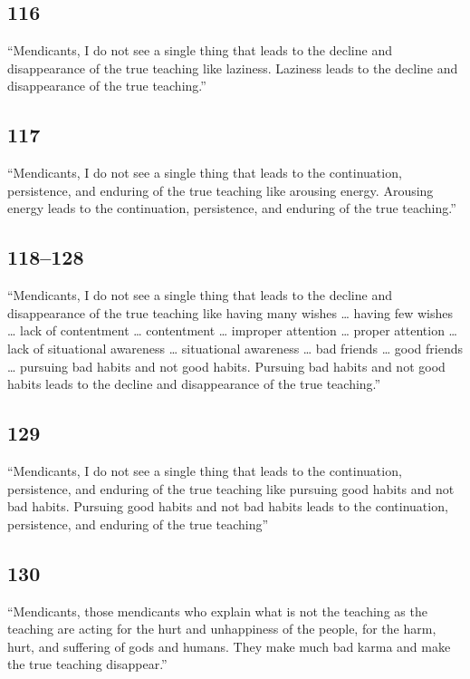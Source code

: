 \documentclass[12pt,openany]{book}%
\begin{document}
\subsection*{116 }

“Mendicants, I do not see a single thing that leads to the decline and disappearance of the true teaching like laziness. Laziness leads to the decline and disappearance of the true teaching.” 

\subsection*{117 }

“Mendicants, I do not see a single thing that leads to the continuation, persistence, and enduring of the true teaching like arousing energy. Arousing energy leads to the continuation, persistence, and enduring of the true teaching.” 

\subsection*{118–128 }

“Mendicants, I do not see a single thing that leads to the decline and disappearance of the true teaching like having many wishes … having few wishes … lack of contentment … contentment … improper attention … proper attention … lack of situational awareness … situational awareness … bad friends … good friends … pursuing bad habits and not good habits. Pursuing bad habits and not good habits leads to the decline and disappearance of the true teaching.” 

\subsection*{129 }

“Mendicants, I do not see a single thing that leads to the continuation, persistence, and enduring of the true teaching like pursuing good habits and not bad habits. Pursuing good habits and not bad habits leads to the continuation, persistence, and enduring of the true teaching” 

\subsection*{130 }

“Mendicants, those mendicants who explain what is not the teaching as the teaching are acting for the hurt and unhappiness of the people, for the harm, hurt, and suffering of gods and humans. They make much bad karma and make the true teaching disappear.” 
\end{document}
